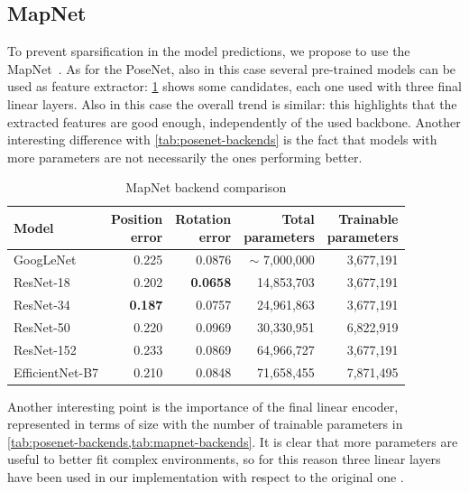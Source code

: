 \subsection{MapNet}
To prevent sparsification in the model predictions, we propose to use the MapNet~\cite{mapnet}. As for the PoseNet, also in this case several pre-trained models can be used as feature extractor: \cref{tab:mapnet-backends} shows some candidates, each one used with three final linear layers.
Also in this case the overall trend is similar: this highlights that the extracted features are good enough, independently of the used backbone. Another interesting difference with \cref{tab:posenet-backends} is the fact that models with more parameters are not necessarily the ones performing better.
\begin{table}[htbp]
    \caption{MapNet backend comparison}
    \begin{center}
        \begin{tabular}{lrrrr}
            \toprule
            {Model}         & \thead{Position                                                  \\error} & \thead{Rotation\\error} & \thead{Total\\parameters} & \thead{Trainable\\parameters} \\
            \midrule
            GoogLeNet       & 0.225           & 0.0876          & $\sim$ 7,000,000 & 3,677,191 \\
            ResNet-18       & 0.202           & \textbf{0.0658} & 14,853,703       & 3,677,191 \\
            ResNet-34       & \textbf{0.187}  & 0.0757          & 24,961,863       & 3,677,191 \\
            ResNet-50       & 0.220           & 0.0969          & 30,330,951       & 6,822,919 \\
            ResNet-152      & 0.233           & 0.0869          & 64,966,727       & 3,677,191 \\
            EfficientNet-B7 & 0.210           & 0.0848          & 71,658,455       & 7,871,495 \\
            \bottomrule
        \end{tabular}
        \label{tab:mapnet-backends}
    \end{center}
\end{table}

Another interesting point is the importance of the final linear encoder, represented in terms of size with the number of trainable parameters in \cref{tab:posenet-backends,tab:mapnet-backends}. It is clear that more parameters are useful to better fit complex environments, so for this reason three linear layers have been used in our implementation with respect to the original one \cite{mapnet}.

